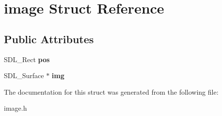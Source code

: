 \hypertarget{structimage}{}\section{image Struct Reference}
\label{structimage}
\subsection*{Public Attributes}
\begin{DoxyCompactItemize}
\item 
\mbox{\label{structimage_a2acdbbb1de48727a9c0c4126e626f7fa}} 
S\+D\+L\+\_\+\+Rect {\bfseries pos}
\item 
\mbox{\label{structimage_a27c5d076eb3f7ede915b271bf8b3a695}} 
S\+D\+L\+\_\+\+Surface $\ast$ {\bfseries img}
\end{DoxyCompactItemize}


The documentation for this struct was generated from the following file\+:\begin{DoxyCompactItemize}
\item 
image.\+h\end{DoxyCompactItemize}
